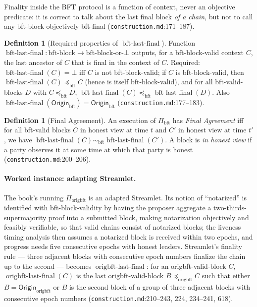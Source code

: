 \documentclass[11pt,a4paper]{article}
\theoremstyle{definition}
\newtheorem{definition}[theorem]{Definition}
\begin{document}
Finality inside the BFT protocol is a function of context, never an
objective predicate: it is correct to talk about the last final block
\emph{of a chain}, but not to call any bft-block objectively bft-final
(\texttt{construction.md}:171--187).

\begin{definition}[Required properties of
$\operatorname{bft\text{-}last\text{-}final}$]\label{def:xl-last-final}
Function $\operatorname{bft\text{-}last\text{-}final} :
\text{bft-block} \to \text{bft-block-or-}\bot$ outputs, for a
bft-block-valid context $C$, the last ancestor of $C$ that is final in the
context of $C$. Required:
$\operatorname{bft\text{-}last\text{-}final}(C) = \bot$ iff $C$ is not
bft-block-valid; if $C$ is bft-block-valid, then
$\operatorname{bft\text{-}last\text{-}final}(C) \preceq_{\mathrm{bft}} C$
(hence is itself bft-block-valid), and for all bft-valid-blocks $D$ with
$C \preceq_{\mathrm{bft}} D$,
$\operatorname{bft\text{-}last\text{-}final}(C) \preceq_{\mathrm{bft}}
\operatorname{bft\text{-}last\text{-}final}(D)$. Also
$\operatorname{bft\text{-}last\text{-}final}(\mathsf{Origin}_{\mathrm{bft}})
= \mathsf{Origin}_{\mathrm{bft}}$ (\texttt{construction.md}:177--183).
\end{definition}

\begin{definition}[Final Agreement]\label{def:xl-final-agreement}
An execution of $\Pi_{\mathrm{bft}}$ has \emph{Final Agreement} iff for
all bft-valid blocks $C$ in honest view at time $t$ and $C'$ in honest
view at time $t'$, we have $\operatorname{bft\text{-}last\text{-}final}(C)
\sim_{\mathrm{bft}} \operatorname{bft\text{-}last\text{-}final}(C')$. A
block is \emph{in honest view} if a party observes it at some time at
which that party is honest (\texttt{construction.md}:200--206).
\end{definition}

\paragraph{Worked instance: adapting Streamlet.} The book's running
$\Pi_{\mathrm{origbft}}$ is an adapted Streamlet. Its notion of
``notarized'' is identified with bft-block-validity by having the
proposer aggregate a two-thirds-supermajority proof into a submitted
block, making notarization objectively and feasibly verifiable, so that
valid chains consist of notarized blocks; the liveness timing analysis
then assumes a notarized block is received within two epochs, and
progress needs five consecutive epochs with honest leaders. Streamlet's
finality rule --- three adjacent blocks with consecutive epoch numbers
finalize the chain up to the second --- becomes
$\operatorname{origbft\text{-}last\text{-}final}$: for an
origbft-valid-block $C$,
$\operatorname{origbft\text{-}last\text{-}final}(C)$ is the last
origbft-valid-block $B \preceq_{\mathrm{origbft}} C$ such that either $B =
\mathsf{Origin}_{\mathrm{origbft}}$ or $B$ is the second block of a group
of three adjacent blocks with consecutive epoch numbers
(\texttt{construction.md}:210--243, 224, 234--241, 618).
\end{document}
